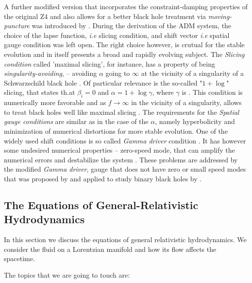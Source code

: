 A further modified version that incorporates the constraint-damping properties of the original Z4 and also allows for a better black hole treatment via \textit{moving-puncture} was introduced by \cite{Alic:2011gg}.
During the derivation of the ADM system, the choice of the lapse function, \textit{i.e} slicing condition, and shift vector \textit{i.e} spatial gauge condition was left open. The right choice however, is crutual for the stable evolution and in itself presents a broad and rapidly evolving subject.
The \textit{Slicing condition} called 'maximal slicing', for instance, has a property of being \textit{singularity-avoiding}, -- avoiding $\alpha$ going to $\infty$ at the vicinity of a singularity of a Schwarzschild black hole \cite{Geyer:1995}.
Of particular relevance is the so-called "$1 + \log$" slicing, that states th.at $\beta_i=0$ and $\alpha = 1 + \log\gamma$, where $\gamma$ is . This condition is numerically more favorable and as $f\rightarrow\infty$ in the vicinity of a singularity, allows to treat black holes well like maximal slicing \cite{Baumgarte:2002jm}.
The requirements for the \textit{Spatial gauge conditions} are similar as in the case of the $\alpha$, namely hyperbolicity and minimization of numerical distortions for more stable evolution. 
One of the widely used shift conditions is so called \textit{Gamma driver} condition \cite{Alcubierre:2002kk}. It has however some undesired numerical properties -- zero-speed mode, that can amplify the numerical errors and destabilize the system \cite{vanMeter:2006vi}. These problems are addressed by the modified \textit{Gamma driver}, gauge that does not have zero or small speed modes that was proposed by \cite{vanMeter:2006vi} and applied to study binary black holes by \cite{Campanelli:2005dd}.



\subsection{The Equations of General-Relativistic Hydrodynamics}


In this section we discuss the equations of general relativistic hydrodynamics. 
We consider the fluid on a Lorentzian manifold and how its flow affects the spacetime.

The topics that we are going to touch are:


